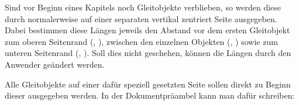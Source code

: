 \begin{Declaration}{}
\begin{Declaration}{}
\begin{Declaration}{}
\begin{Declaration}{}
\begin{Declaration}{}
\begin{Declaration}{}
\printdeclarationlist*%
%
Sind vor Beginn eines Kapitels noch Gleitobjekte verblieben, so werden diese 
durch  normalerweise auf einer separaten vertikal zentriert Seite 
ausgegeben. Dabei bestimmen diese Längen jeweils den Abstand vor dem ersten 
Gleitobjekt zum oberen Seitenrand (, ), 
zwischen den einzelnen Objekten (, ) sowie 
zum unteren Seitenrand (, ). Soll dies nicht 
geschehen, können die Längen durch den Anwender geändert werden.
\end{Declaration}
\end{Declaration}
\end{Declaration}
\end{Declaration}
\end{Declaration}
\end{Declaration}
%
\begin{Example}
Alle Gleitobjekte auf einer dafür speziell gesetzten Seite sollen direkt zu 
Beginn dieser ausgegeben werden. In der Dokumentpräambel kann man dafür 
schreiben:
\begin{Code}
\makeatletter
\setlength{\@fptop}{0pt}
\setlength{\@dblfptop}{0pt} %
\makeatother
\end{Code}
\end{Example}



